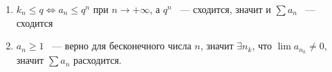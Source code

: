 \documentclass[../main.tex]{subfiles}
\begin{document}
            \begin{enumerate}
            
                \item $k_n \leq q \Longleftrightarrow a_n \leq q^n$ при $n \rightarrow +\infty$, а $q^n$ ~--- сходится, значит и $\sum a_n$ ~--- сходится
                
                \item $a_n \geq 1$ ~--- верно для бесконечного числа $n$, значит $\exists n_k$, что $\lim a_{n_k} \neq 0$, значит $\sum a_n$ расходится.
                
            \end{enumerate}

\newpage
\end{document}
